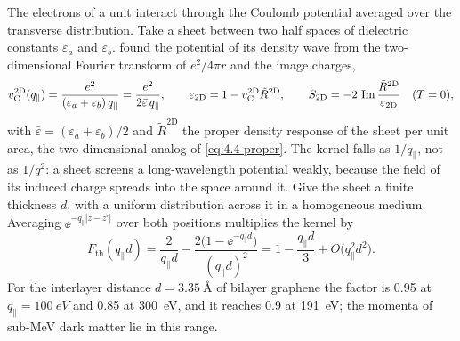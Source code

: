 The electrons of a unit interact through the Coulomb potential averaged over the transverse distribution. Take a sheet between two half spaces of dielectric constants $\varepsilon_a$ and $\varepsilon_b$.  found the potential of its density wave from the two-dimensional Fourier transform of $e^2/4\pi r$ and the image charges,
\begin{equation}
  v_{\mathrm{C}}^{\mathrm{2D}}(q_\parallel) = \frac{e^2}{(\varepsilon_a + \varepsilon_b)\,q_\parallel} = \frac{e^2}{2\bar\varepsilon\,q_\parallel} ,
  \qquad
  \varepsilon_{\mathrm{2D}} = 1 - v_{\mathrm{C}}^{\mathrm{2D}}\tilde R^{\mathrm{2D}} ,
  \qquad
  S_{\mathrm{2D}} = -2\,\operatorname{Im}\frac{\tilde R^{\mathrm{2D}}}{\varepsilon_{\mathrm{2D}}} \quad (T = 0) ,
  \label{eq:16.2-kernel2D}
\end{equation}
with $\bar\varepsilon = (\varepsilon_a + \varepsilon_b)/2$ and $\tilde R^{\mathrm{2D}}$ the proper density response of the sheet per unit area, the two-dimensional analog of \cref{eq:4.4-proper}. The kernel falls as $1/q_\parallel$, not as $1/q^2$: a sheet screens a long-wavelength potential weakly, because the field of its induced charge spreads into the space around it. Give the sheet a finite thickness $d$, with a uniform distribution across it in a homogeneous medium. Averaging $\ee^{-q_\parallel|z - z'|}$ over both positions multiplies the kernel by
\begin{equation}
  F_{\mathrm{th}}(q_\parallel d) = \frac{2}{q_\parallel d} - \frac{2\bigl(1 - \ee^{-q_\parallel d}\bigr)}{(q_\parallel d)^2} = 1 - \frac{q_\parallel d}{3} + O\bigl(q_\parallel^2d^2\bigr) .
  \label{eq:16.2-thick}
\end{equation}
For the interlayer distance $d = \SI{3.35}{\angstrom}$ of bilayer graphene the factor is 0.95 at $q_\parallel = \SI{100}{eV}$ and 0.85 at \SI{300}{eV}, and it reaches 0.9 at \SI{191}{eV}; the momenta of sub-MeV dark matter lie in this range.

